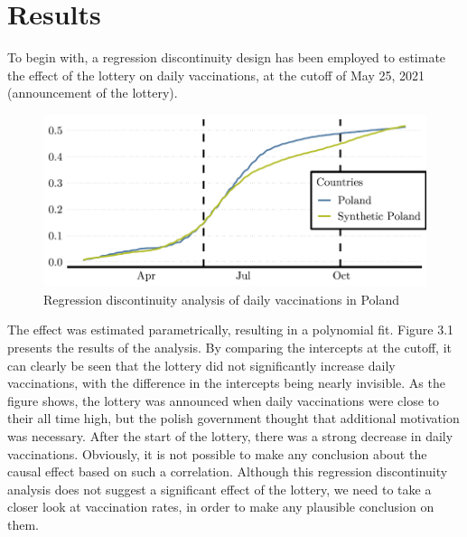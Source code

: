 \documentclass{scrbook}
\begin{document}
\chapter{Results}

To begin with, a regression discontinuity design has been employed to
estimate the effect of the lottery on daily vaccinations, at the cutoff
of May 25, 2021 (announcement of the lottery).

\begin{figure}[h]
\caption{Regression discontinuity analysis of daily vaccinations in Poland}

\begin{center}\includegraphics{bachelor_thesis_files/figure-latex/unnamed-chunk-3-1} \end{center}
\end{figure}

The effect was estimated parametrically, resulting in a polynomial fit.
Figure 3.1 presents the results of the analysis. By comparing the
intercepts at the cutoff, it can clearly be seen that the lottery did
not significantly increase daily vaccinations, with the difference in
the intercepts being nearly invisible. As the figure shows, the lottery
was announced when daily vaccinations were close to their all time high,
but the polish government thought that additional motivation was
necessary. After the start of the lottery, there was a strong decrease
in daily vaccinations. Obviously, it is not possible to make any
conclusion about the causal effect based on such a correlation. Although
this regression discontinuity analysis does not suggest a significant
effect of the lottery, we need to take a closer look at vaccination
rates, in order to make any plausible conclusion on them.
\end{document}
